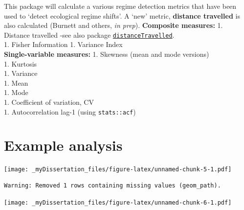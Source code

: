 \documentclass[12pt,twoside,openany]{reedthesis}
\begin{document}
This package will calculate a various regime detection metrics that have been used to `detect ecological regime shifts'. A `new' metric, \textbf{distance travelled} is also calculated (Burnett and others, \emph{in prep}).
\textbf{Composite measures:}
1. Distance travelled -see also package \href{https://github.com/TrashBirdEcology/distanceTravelled}{\texttt{distanceTravelled}}.\\
1. Fisher Information
1. Variance Index\\
\textbf{Single-variable measures:}
1. Skewness (mean and mode versions)\\
1. Kurtosis\\
1. Variance\\
1. Mean\\
1. Mode\\
1. Coefficient of variation, CV\\
1. Autocorrelation lag-1 (using \texttt{stats::acf})

\hypertarget{example-analysis}{%
\section{Example analysis}\label{example-analysis}}

\texttt{[image: \_myDissertation\_files/figure-latex/unnamed-chunk-5-1.pdf]}
\begin{verbatim}
Warning: Removed 1 rows containing missing values (geom_path).
\end{verbatim}
\texttt{[image: \_myDissertation\_files/figure-latex/unnamed-chunk-6-1.pdf]}
\end{document}
